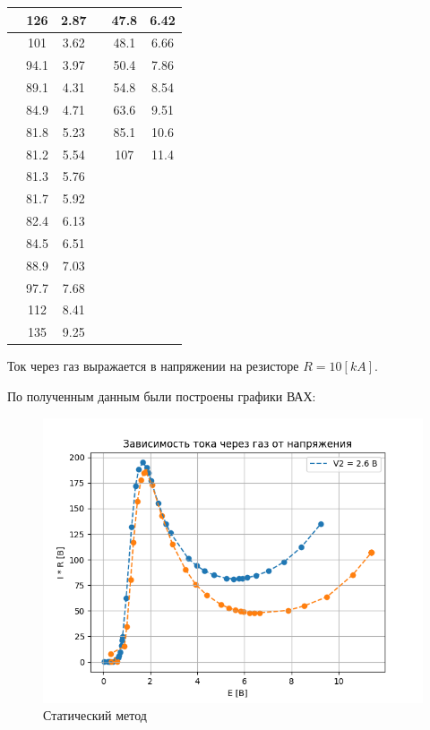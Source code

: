 \documentclass[a4paper,12pt]{article} %
\begin{document}
\begin{table}[h!]
\begin{tabular}{|c|c|c|c|c|c|}
             & 126   & 2.87  &        & 47.8  & 6.42 \\ \hline
             & 101   & 3.62  &        & 48.1  & 6.66 \\ \hline
             & 94.1  & 3.97  &        & 50.4  & 7.86 \\ \hline
             & 89.1  & 4.31  &        & 54.8  & 8.54 \\ \hline
             & 84.9  & 4.71  &        & 63.6  & 9.51 \\ \hline
             & 81.8  & 5.23  &        & 85.1  & 10.6 \\ \hline
             & 81.2  & 5.54  &        & 107   & 11.4 \\ \hline
             & 81.3  & 5.76  &        &       &      \\ \hline
             & 81.7  & 5.92  &        &       &      \\ \hline
             & 82.4  & 6.13  &        &       &      \\ \hline
             & 84.5  & 6.51  &        &       &      \\ \hline
             & 88.9  & 7.03  &        &       &      \\ \hline
             & 97.7  & 7.68  &        &       &      \\ \hline
             & 112   & 8.41  &        &       &      \\ \hline
             & 135   & 9.25  &        &       &      \\ \hline
      \end{tabular}
    \end{table}
  \newpage
    Ток через газ выражается в напряжении на резисторе $R = 10 [kA]$.\par
    По полученным данным были построены графики ВАХ:\par
    \begin{figure}[h]
      \centering
      \includegraphics[width=1.2\textwidth]{img/Gra.png}
      \caption{Статический метод}
    \end{figure} 
\end{document}
